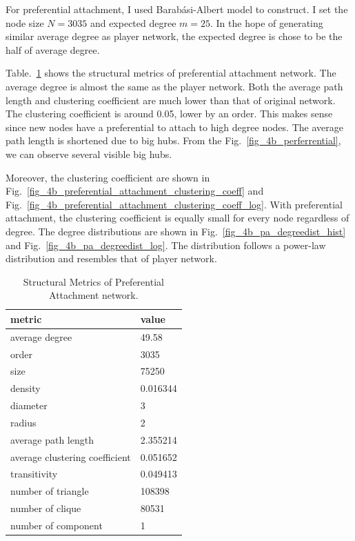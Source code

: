 \documentclass[runningheads]{llncs}
\begin{document}
For preferential attachment, I used Barabási-Albert model to construct.  I set the node size \(N = 3035\) and expected degree \( m =25 \). In the hope of generating similar average degree as player network, the expected degree is chose to be the half of average degree. 

Table.~\ref{tab_prefere_attach} shows the structural metrics of preferential attachment network. The average degree is almost the same as the player network. Both the average path length and clustering coefficient are much lower than that of original network. The clustering coefficient is around 0.05, lower by an order. This makes sense since new nodes have a preferential to attach to high degree nodes. The average path length is shortened due to big hubs. From the Fig.~\ref{fig_4b_perferrential}, we can observe several visible big hubs.

	Moreover, the clustering coefficient are shown in Fig.~\ref{fig_4b_preferential_attachment_clustering_coeff} and  Fig.~\ref{fig_4b_preferential_attachment_clustering_coeff_log}. With preferential attachment, the clustering coefficient is equally small for every node regardless of degree. 
 The degree distributions are shown in Fig.~\ref{fig_4b_pa_degreedist_hist} and  Fig.~\ref{fig_4b_pa_degreedist_log}. The distribution follows a power-law distribution and resembles that of player network.

\begin{table}
\centering
\caption{Structural Metrics of Preferential Attachment network.}\label{tab_prefere_attach}
\begin{tabular}{|l|l|}
\hline
metric & value \\
\hline
average degree & 49.58 \\
order & 3035 \\
size & 75250 \\
density & 0.016344 \\
diameter & 3 \\
radius & 2 \\
average path length & 2.355214 \\
average clustering coefficient & 0.051652 \\
transitivity & 0.049413 \\
number of triangle & 108398 \\ 
number of clique & 80531 \\
number of component & 1 \\ \hline
\end{tabular}
\end{table}
\end{document}

